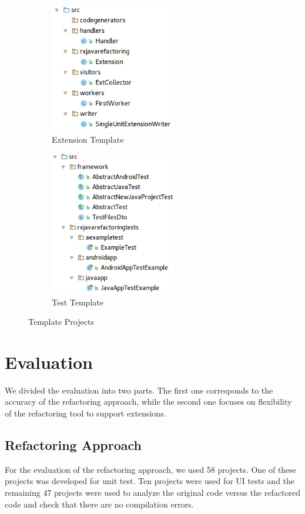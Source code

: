 \documentclass[type=bsc,accentcolor=tud9c]{tudthesis}
\begin{document}
\begin{figure}[h]
\begin{subfigure}{0.5\textwidth}
\begin{center}
\includegraphics[width=5.5cm]{templates/extension.png}
\end{center}
\caption{Extension Template}
\label{fig:template-ext}
\end{subfigure}
\begin{subfigure}{0.5\textwidth}
\begin{center}
\includegraphics[width=5.5cm]{templates/tests.png}
\end{center}
\caption{Test Template}
\label{fig:template-test}
\end{subfigure}
\caption{Template Projects}
\end{figure}



\chapter{Evaluation}
\label{chapter:evaluation}
We divided the evaluation into two parts. The first one corresponds to the accuracy of the refactoring approach, while the second one focuses on flexibility of the refactoring tool to support extensions.

\section{Refactoring Approach}
For the evaluation of the refactoring approach, we used 58 projects. One of these projects was developed for unit test. Ten projects were used for UI tests and the remaining 47 projects were used to analyze the original code versus the refactored code and check that there are no compilation errors.
\end{document}
